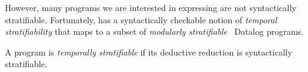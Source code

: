 However, many programs we are interested in expressing are not syntactically
stratifiable.  Fortunately, \slang has a syntactically checkable notion of
{\em temporal stratifiability} that maps to a subset of {\em modularly
stratifiable}~\cite{modular} Datalog programs.



%
%

%

%
%

%
%




\begin{definition} 
%
A \slang program is \emph{temporally stratifiable} if its deductive
reduction is syntactically stratifiable.
%
\end{definition}

